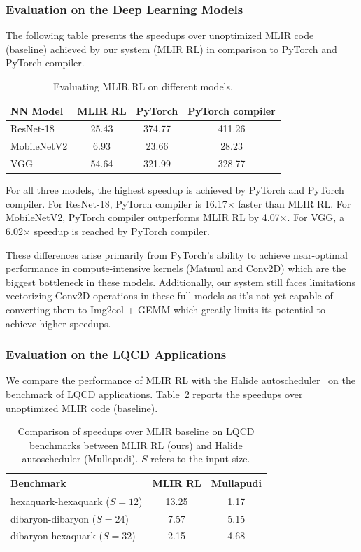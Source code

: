 \documentclass[10pt,twocolumn]{article}
\begin{document}
\subsubsection{Evaluation on the Deep Learning Models}
The following table presents the speedups over unoptimized MLIR code (baseline) achieved by our system (MLIR RL) in comparison to PyTorch and PyTorch compiler.

\begin{table}[t]
\centering
\caption{Evaluating MLIR RL on different models.}
\label{tab:models}
\begin{tabular}{lccc}
\toprule
NN Model & MLIR RL & PyTorch & PyTorch compiler \\
\midrule
ResNet-18 & 25.43 & 374.77 & 411.26 \\
MobileNetV2 & 6.93 & 23.66 & 28.23 \\
VGG & 54.64 & 321.99 & 328.77 \\
\bottomrule
\end{tabular}
\end{table}

For all three models, the highest speedup is achieved by PyTorch and PyTorch compiler. For ResNet-18, PyTorch compiler is 16.17$\times$ faster than MLIR RL. For MobileNetV2, PyTorch compiler outperforms MLIR RL by 4.07$\times$. For VGG, a 6.02$\times$ speedup is reached by PyTorch compiler.

These differences arise primarily from PyTorch's ability to achieve near-optimal performance in compute-intensive kernels (Matmul and Conv2D) which are the biggest bottleneck in these models. Additionally, our system still faces limitations vectorizing Conv2D operations in these full models as it's not yet capable of converting them to Img2col + GEMM which greatly limits its potential to achieve higher speedups.

\subsubsection{Evaluation on the LQCD Applications}
We compare the performance of MLIR RL with the Halide autoscheduler~\cite{ref16} on the benchmark of LQCD applications. Table~\ref{tab:lqcd} reports the speedups over unoptimized MLIR code (baseline).

\begin{table}[t]
\centering
\caption{Comparison of speedups over MLIR baseline on LQCD benchmarks between MLIR RL (ours) and Halide autoscheduler (Mullapudi). $S$ refers to the input size.}
\label{tab:lqcd}
\begin{tabular}{lcc}
\toprule
Benchmark & MLIR RL & Mullapudi \\
\midrule
hexaquark-hexaquark ($S=12$) & 13.25 & 1.17 \\
dibaryon-dibaryon ($S=24$) & 7.57 & 5.15 \\
dibaryon-hexaquark ($S=32$) & 2.15 & 4.68 \\
\bottomrule
\end{tabular}
\end{table}
\end{document}
